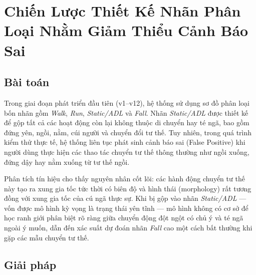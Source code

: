 \documentclass[../DoAn.tex]{subfiles}
\begin{document}
\section{Chiến Lược Thiết Kế Nhãn Phân Loại Nhằm Giảm Thiểu Cảnh Báo Sai}

\subsection{Bài toán}

Trong giai đoạn phát triển đầu tiên (v1--v12), hệ thống sử dụng sơ đồ phân loại bốn nhãn gồm \textit{Walk}, \textit{Run}, \textit{Static/ADL} và \textit{Fall}. Nhãn \textit{Static/ADL} được thiết kế để gộp tất cả các hoạt động còn lại không thuộc di chuyển hay té ngã, bao gồm đứng yên, ngồi, nằm, cúi người và chuyển đổi tư thế. Tuy nhiên, trong quá trình kiểm thử thực tế, hệ thống liên tục phát sinh cảnh báo sai (False Positive) khi người dùng thực hiện các thao tác chuyển tư thế thông thường như ngồi xuống, đứng dậy hay nằm xuống từ tư thế ngồi.

Phân tích tín hiệu cho thấy nguyên nhân cốt lõi: các hành động chuyển tư thế này tạo ra xung gia tốc tức thời có biên độ và hình thái (morphology) rất tương đồng với xung gia tốc của cú ngã thực sự. Khi bị gộp vào nhãn \textit{Static/ADL} --- vốn được mô hình kỳ vọng là trạng thái yên tĩnh --- mô hình không có cơ sở để học ranh giới phân biệt rõ ràng giữa chuyển động đột ngột có chủ ý và té ngã ngoài ý muốn, dẫn đến xác suất dự đoán nhãn \textit{Fall} cao một cách bất thường khi gặp các mẫu chuyển tư thế.

\subsection{Giải pháp}
\end{document}
